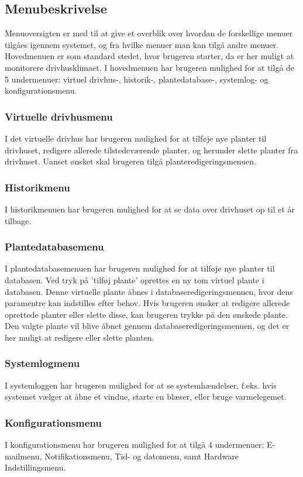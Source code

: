 \subsection{Menubeskrivelse}
Menuoversigten er med til at give et overblik over hvordan de forskellige menuer tilgåes igennem systemet, og fra hvilke menuer man kan tilgå andre menuer. Hovedmenuen er som standard stedet, hvor brugeren starter, da er her muligt at monitorere drivhusklimaet. I hovedmenuen har brugeren mulighed for at tilgå de 5 undermenuer: virtuel drivhus-, historik-, plantedatabase-, systemlog- og konfigurationsmenu.

\subsubsection{Virtuelle drivhusmenu}
I det virtuelle drivhus har brugeren mulighed for at tilføje nye planter til drivhuset, redigere allerede tilstedeværende planter, og herunder slette planter fra drivhuset. Uanset ønsket skal brugeren tilgå planteredigeringsmenuen.

\subsubsection{Historikmenu}
I historikmenuen har brugeren mulighed for at se data over drivhuset op til et år tilbage.

\subsubsection{Plantedatabasemenu}
I plantedatabasemenuen har brugeren mulighed for at tilføje nye planter til databasen. Ved tryk på 'tilføj plante' oprettes en ny tom virtuel plante i databasen. Denne virtuelle plante åbnes i databaseredigeringsmenuen, hvor dens paramentre kan indstilles efter behov. Hvis brugeren ønsker at redigere allerede oprettede planter eller slette disse, kan brugeren trykke på den ønskede plante. Den valgte plante vil blive åbnet gennem databaseredigeringsmenuen, og det er her muligt at redigere eller slette planten.

\subsubsection{Systemlogmenu}
I systemloggen har brugeren mulighed for at se systemhændelser, f.eks. hvis systemet vælger at åbne et vindue, starte en blæser, eller bruge varmelegemet.

\subsubsection{Konfigurationsmenu}
I konfigurationsmenu har brugeren mulighed for at tilgå 4 undermenuer: E-mailmenu, Notifikationsmenu, Tid- og datomenu, samt Hardware Indstillingsmenu.


